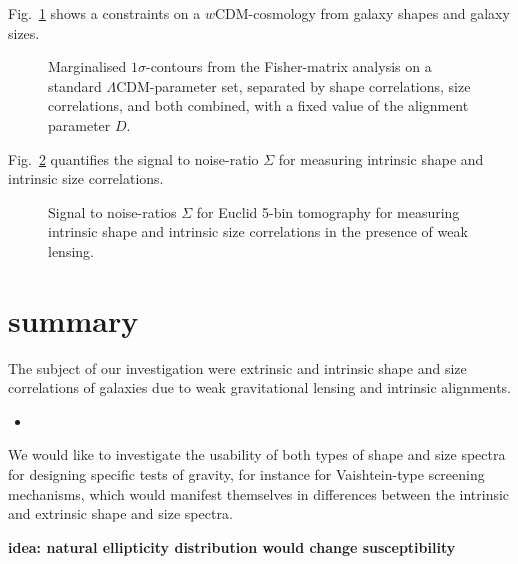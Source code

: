 \documentclass[a4paper,fleqn,usenatbib]{mnras}
\def\spirou#1{{\bf #1}}
\begin{document}
Fig.~\ref{fig:fisher} shows a constraints on a $w$CDM-cosmology from galaxy shapes and galaxy sizes.

\begin{figure}
\centering
\caption{Marginalised $1\sigma$-contours from the Fisher-matrix analysis on a standard $\Lambda$CDM-parameter set, separated by shape correlations, size correlations, and both combined, with a fixed value of the alignment parameter $D$.}
\label{fig:fisher}
\end{figure}

Fig.~\ref{fig:s2n} quantifies the signal to noise-ratio $\Sigma$ for measuring intrinsic shape and intrinsic size correlations.

\begin{figure}
\centering
\caption{Signal to noise-ratios $\Sigma$ for Euclid 5-bin tomography for measuring intrinsic shape and intrinsic size correlations in the presence of weak lensing.}
\label{fig:s2n}
\end{figure}


\section{summary}\label{sect_summary}
The subject of our investigation were extrinsic and intrinsic shape and size correlations of galaxies due to weak gravitational lensing and intrinsic alignments. 
\begin{itemize}
\item{}
\end{itemize}
We would like to investigate the usability of both types of shape and size spectra for designing specific tests of gravity, for instance for Vaishtein-type screening mechanisms, which would manifest themselves in differences between the intrinsic and extrinsic shape and size spectra.

\spirou{idea: natural ellipticity distribution would change susceptibility}
\end{document}
